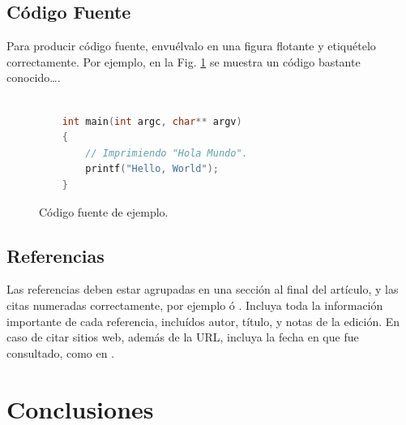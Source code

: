 \documentclass[a4paper,10pt,twocolumn]{article}
\begin{document}
	\subsection{Código Fuente}\label{sub:listings}
		Para producir código fuente, envuélvalo en una figura flotante y
		etiquételo correctamente. Por ejemplo, en la Fig. \ref{fig:code}
		se muestra un código bastante conocido\ldots.


		\begin{figure}[htb]%
			\begin{lstlisting}[language=c]%

    int main(int argc, char** argv)
    {
        // Imprimiendo "Hola Mundo".
        printf("Hello, World");
    }

			\end{lstlisting}
		\caption{Código fuente de ejemplo.\label{fig:code}}
		\end{figure}

	\subsection{Referencias}
  	Las referencias deben estar agrupadas en una sección al final del artículo,
  	y las citas numeradas correctamente, por ejemplo \cite{knuth} ó \cite{goedel}.
  	Incluya toda la información importante de cada referencia, incluídos autor,
  	título, y notas de la edición. En caso de citar sitios web, además
  	de la URL, incluya la fecha en que fue consultado, como en \cite{wiki}.




\section{Conclusiones}\label{sec:conc}
\end{document}
